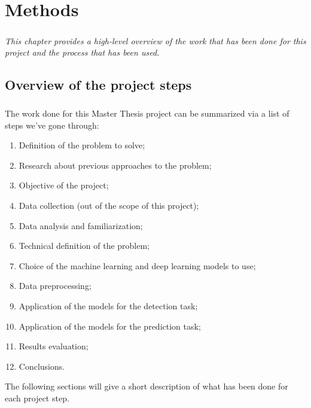 
\chapter{Methods} \label{chap: methods}

\paragraph{} \textit{This chapter provides a high-level overview of the work that has been done for this project and the process that has been used.}


\section{Overview of the project steps} \label{sec: overview_project_steps}
\paragraph{} The work done for this Master Thesis project can be summarized via a list of steps we've gone through:
\begin{enumerate}
    \item Definition of the problem to solve;
    \item Research about previous approaches to the problem;
    \item Objective of the project;
    \item Data collection (out of the scope of this project);
    \item Data analysis and familiarization;
    \item Technical definition of the problem;
    \item Choice of the machine learning and deep learning models to use;
    \item Data preprocessing;
    \item Application of the models for the detection task;
    \item Application of the models for the prediction task;
    \item Results evaluation;
    \item Conclusions.
\end{enumerate}
The following sections will give a short description of what has been done for each project step.

